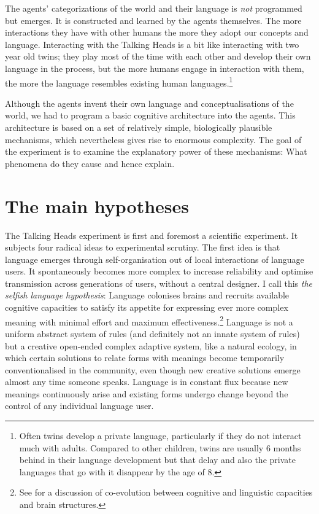 The agents' categorizations of
the world and their language is {\itshape not} programmed but
emerges. It is 
constructed and learned by the agents themselves. The more 
interactions they have with other humans the more they 
adopt our concepts and language. Interacting with the Talking 
Heads is a bit like interacting with two year old 
twins; they play  most of the time with each other and
develop their own language in the process, but the more
humans engage in interaction with them, the more the language
resembles existing human languages.\footnote{Often twins develop a private language, particularly 
if they do not interact much with adults. Compared
to other children, twins are usually 6 months behind 
in their language development but that delay and 
also the private languages that go with it disappear
by the age of 8.}

Although the agents invent their own 
language and conceptualisations of the world, we
had to program a basic cognitive architecture into 
the agents. This architecture is based on a set of relatively
simple, biologically plausible mechanisms, which 
nevertheless gives rise to enormous complexity.
The goal of the experiment is to examine the explanatory power of 
these mechanisms: What phenomena do they cause and
hence explain. 

\section{The main hypotheses}

The Talking Heads experiment is first and foremost
a scientific experiment. It subjects four radical ideas 
to experimental scrutiny. 
The first idea is that 
language emerges through self-organisation out of local
interactions of language users. It spontaneously 
becomes more complex to increase
reliability and optimise transmission across generations of 
users, without a central designer.
I call this {\itshape the selfish
language hypothesis}: Language colonises
brains and recruits available cognitive capacities to satisfy
its appetite for expressing ever more complex meaning with
minimal effort and maximum 
effectiveness.\footnote{
See \cite{Deacon:1998} for a discussion of 
co-evolution between cognitive and linguistic
capacities and brain structures.}
Language is 
not a uniform abstract system of rules (and definitely not an 
innate system of rules) but a creative open-ended complex
adaptive system, like a natural
ecology, in which certain solutions to relate forms with 
meanings become temporarily conventionalised in 
the community, even though new creative solutions
emerge almost any time someone speaks. Language
is in constant flux because new meanings continuously
arise and existing forms undergo change beyond the 
control of any individual language user. 


